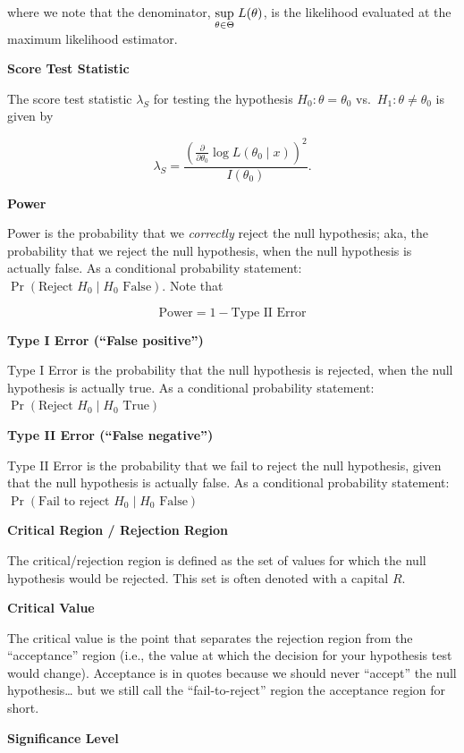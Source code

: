 \documentclass[
  letterpaper,
  DIV=11,
  numbers=noendperiod]{scrreprt}
\begin{document}
where we note that the denominator,
\(\underset{\theta \in \Theta}{\text{sup}} \hspace{1mm} L(\theta)\), is
the likelihood evaluated at the maximum likelihood estimator.

\textbf{Score Test Statistic}

The score test statistic \(\lambda_S\) for testing the hypothesis
\(H_0: \theta = \theta_0\) vs.~\(H_1: \theta \neq \theta_0\) is given by

\[
\lambda_S = \frac{\left( \frac{\partial}{\partial \theta_0} \log L(\theta_0 \mid x) \right)^2}{I(\theta_0)}.
\]

\textbf{Power}

Power is the probability that we \emph{correctly} reject the null
hypothesis; aka, the probability that we reject the null hypothesis,
when the null hypothesis is actually false. As a conditional probability
statement: \(\Pr(\text{Reject }H_0 \mid H_0 \text{ False})\). Note that

\[
\text{Power} = 1 - \text{Type II Error}
\]

\textbf{Type I Error (``False positive'')}

Type I Error is the probability that the null hypothesis is rejected,
when the null hypothesis is actually true. As a conditional probability
statement: \(\Pr(\text{Reject }H_0 \mid H_0 \text{ True})\)

\textbf{Type II Error (``False negative'')}

Type II Error is the probability that we fail to reject the null
hypothesis, given that the null hypothesis is actually false. As a
conditional probability statement:
\(\Pr(\text{Fail to reject }H_0 \mid H_0 \text{ False})\)

\textbf{Critical Region / Rejection Region}

The critical/rejection region is defined as the set of values for which
the null hypothesis would be rejected. This set is often denoted with a
capital \(R\).

\textbf{Critical Value}

The critical value is the point that separates the rejection region from
the ``acceptance'' region (i.e., the value at which the decision for
your hypothesis test would change). Acceptance is in quotes because we
should never ``accept'' the null hypothesis\ldots{} but we still call
the ``fail-to-reject'' region the acceptance region for short.

\textbf{Significance Level}
\end{document}
